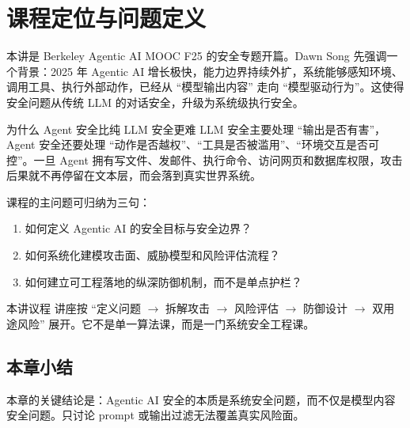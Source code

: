 \section{课程定位与问题定义}

本讲是 Berkeley Agentic AI MOOC F25 的安全专题开篇。Dawn Song 先强调一个背景：2025 年 Agentic AI 增长极快，能力边界持续外扩，系统能够感知环境、调用工具、执行外部动作，已经从 ``模型输出内容'' 走向 ``模型驱动行为''。这使得安全问题从传统 LLM 的对话安全，升级为系统级执行安全。

\begin{importantbox}{为什么 Agent 安全比纯 LLM 安全更难}
LLM 安全主要处理 ``输出是否有害''，Agent 安全还要处理 ``动作是否越权''、``工具是否被滥用''、``环境交互是否可控''。一旦 Agent 拥有写文件、发邮件、执行命令、访问网页和数据库权限，攻击后果就不再停留在文本层，而会落到真实世界系统。
\end{importantbox}

课程的主问题可归纳为三句：
\begin{enumerate}
    \item 如何定义 Agentic AI 的安全目标与安全边界？
    \item 如何系统化建模攻击面、威胁模型和风险评估流程？
    \item 如何建立可工程落地的纵深防御机制，而不是单点护栏？
\end{enumerate}

\begin{knowledgebox}{本讲议程}
讲座按 ``定义问题 $\rightarrow$ 拆解攻击 $\rightarrow$ 风险评估 $\rightarrow$ 防御设计 $\rightarrow$ 双用途风险'' 展开。它不是单一算法课，而是一门系统安全工程课。
\end{knowledgebox}

\subsection{本章小结}
本章的关键结论是：Agentic AI 安全的本质是系统安全问题，而不仅是模型内容安全问题。只讨论 prompt 或输出过滤无法覆盖真实风险面。

